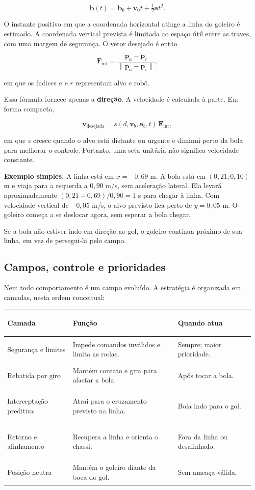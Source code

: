 \documentclass[11pt,a4paper]{article}
\begin{document}
\[
  \mathbf{b}(t)=\mathbf{b}_0+\mathbf{v}_0t+\tfrac12\mathbf{a}t^2.
\]

O instante positivo em que a coordenada horizontal atinge a linha do goleiro é
estimado. A coordenada vertical prevista é limitada ao espaço útil entre as
traves, com uma margem de segurança. O vetor desejado é então

\[
  \mathbf{F}_{\mathrm{int}}=
  \frac{\mathbf{p}_{a}-\mathbf{p}_{r}}
       {\lVert\mathbf{p}_{a}-\mathbf{p}_{r}\rVert},
\]

em que os índices $a$ e $r$ representam alvo e robô.

Essa fórmula fornece apenas a \textbf{direção}. A velocidade é calculada à
parte. Em forma compacta,

\[
  \mathbf{v}_{\mathrm{desejada}}=s(d,\mathbf{v}_{b},\mathbf{a}_{b},t)\,
  \mathbf{F}_{\mathrm{int}},
\]

em que $s$ cresce quando o alvo está distante ou urgente e diminui perto da
bola para melhorar o controle. Portanto, uma seta unitária não significa
velocidade constante.

\textbf{Exemplo simples.} A linha está em $x=-0{,}69$ m. A bola está em
$(0{,}21;0{,}10)$ m e viaja para a esquerda a $0{,}90$ m/s, sem aceleração
lateral. Ela levará aproximadamente $(0{,}21+0{,}69)/0{,}90=1$ s para chegar à
linha. Com velocidade vertical de $-0{,}05$ m/s, o alvo previsto fica perto de
$y=0{,}05$ m. O goleiro começa a se deslocar agora, sem esperar a bola chegar.

Se a bola não estiver indo em direção ao gol, o goleiro continua próximo de sua
linha, em vez de persegui-la pelo campo.

\subsection*{Campos, controle e prioridades}

Nem todo comportamento é um campo evoluído. A estratégia é organizada em
camadas, nesta ordem conceitual:

\begin{tabularx}{\linewidth}{>{\bfseries\raggedright\arraybackslash}p{3.2cm} X p{2.4cm}}
\toprule
Camada & Função & Quando atua \\
\midrule
Segurança e limites & Impede comandos inválidos e limita as rodas. & Sempre; maior prioridade. \\
Rebatida por giro & Mantém contato e gira para afastar a bola. & Após tocar a bola. \\
Interceptação preditiva & Atrai para o cruzamento previsto na linha. & Bola indo para o gol. \\
Retorno e alinhamento & Recupera a linha e orienta o chassi. & Fora da linha ou desalinhado. \\
Posição neutra & Mantém o goleiro diante da boca do gol. & Sem ameaça válida. \\
\bottomrule
\end{tabularx}
\end{document}

